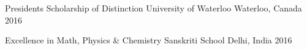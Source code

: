 
\begin{cvhonors}

  \cvhonor
    {Presidents Scholarship of Distinction} %
    {University of Waterloo} %
    {Waterloo, Canada} %
    {2016} %

  \cvhonor
    {Excellence in Math, Physics \& Chemistry} %
    {Sanskriti School} %
    {Delhi, India} %
    {2016} %
    
   

\end{cvhonors}
